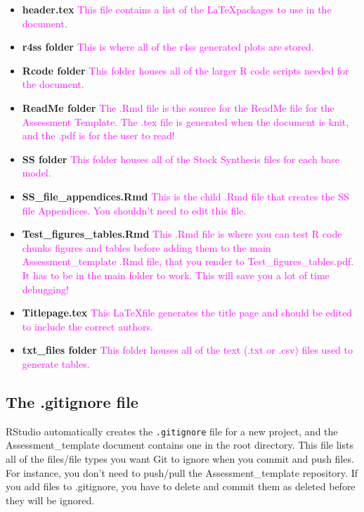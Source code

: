 \documentclass[12pt,]{article}
\begin{document}
\begin{itemize}
\item
  \textbf{header.tex}
  \textcolor{magenta}{This file contains a list of the \LaTeX packages to use in the document.}
\item
  \textbf{r4ss folder}
  \textcolor{magenta}{This is where all of the r4ss generated plots are stored.}
\item
  \textbf{Rcode folder}
  \textcolor{magenta}{This folder houses all of the larger R code scripts needed for the document.}
\item
  \textbf{ReadMe folder}
  \textcolor{magenta}{The .Rmd file is the source for the ReadMe file for the Assessment Template.  The .tex file is generated when the document is knit, and the .pdf is for the user to read!}
\item
  \textbf{SS folder}
  \textcolor{magenta}{This folder houses all of the Stock Synthesis files for each base model.}
\item
  \textbf{SS\_file\_appendices.Rmd}
  \textcolor{magenta}{This is the child .Rmd file that creates the SS file Appendices.  You shouldn't need to edit this file.}
\item
  \textbf{Test\_figures\_tables.Rmd}
  \textcolor{magenta}{This .Rmd file is where you can test R code chunks figures and tables before adding them to the main Assessment\_template .Rmd file, that you render to Test\_figures\_tables.pdf.  It has to be in the main folder to work.  This will save you a lot of time debugging!}
\item
  \textbf{Titlepage.tex}
  \textcolor{magenta}{This \LaTeX file generates the title page and should be edited to include the correct authors.}
\item
  \textbf{txt\_files folder }
  \textcolor{magenta}{This folder houses all of the text (.txt or .csv) files used to generate tables.}
\end{itemize}

\subsection{The .gitignore file}\label{the-.gitignore-file}

RStudio automatically creates the \texttt{.gitignore} file for a new
project, and the Assessment\_template document contains one in the root
directory. This file lists all of the files/file types you want Git to
ignore when you commit and push files. For instance, you don't need to
push/pull the Assessment\_template repository. If you add files to
.gitignore, you have to delete and commit them as deleted before they
will be ignored.
\end{document}
